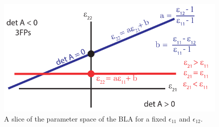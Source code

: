 \documentclass{article} %
\theoremstyle{definition}
\theoremstyle{remark}
\begin{document}
\begin{figure}[H]
  \centering
  \includegraphics[width=\textwidth]{bla_parameter_space}
  \caption{A slice of the parameter space of the BLA for a fixed \(\epsilon_{11}\) and \(\epsilon_{12}\). %
  }\label{fig:blaparameterspace}
\end{figure}
\end{document}
